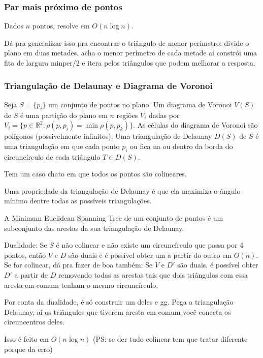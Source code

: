 \subsubsection{Par mais próximo de pontos}

Dados $n$ pontos, resolve em $O(n \log n)$.


Dá pra generalizar isso pra encontrar o triângulo de menor perímetro:
divide o plano em duas metades, acha o menor perímetro de cada metade
aí constrói uma fita de largura $\text{minper}/2$ e itera pelos triângulos
que podem melhorar a resposta.

\subsubsection{Triangulação de Delaunay e Diagrama de Voronoi}

Seja $S = \{p_i\}$ um conjunto de pontos no plano. Um diagrama de Voronoi
$V(S)$ de $S$ é uma partição do plano em $n$ regiões $V_i$ dadas por
$V_i = \{ p \in \mathbb{R}^2 : \rho(p, p_i) = \min \rho(p, p_k)\}$. As células
do diagrama de Voronoi são polígonos (possivelmente infinitos). Uma triangulação
de Delaunay $D(S)$ de $S$ é uma triangulação em que cada ponto $p_i$ ou fica na ou
dentro da borda do circuncírculo de cada triângulo $T \in D(S)$.

Tem um caso chato em que todos os pontos são colineares.

Uma propriedade da triangulação de Delaunay é que ela maximiza o ângulo mínimo
dentre todas as possíveis triangulações.

A Minimum Euclidean Spanning Tree de um conjunto de pontos é um subconjunto
das arestas da sua triangulação de Delaunay.

Dualidade: Se $S$ é não colinear e não existe um circuncírculo que passa por 
4 pontos, então $V$ e $D$ são duais e é possível obter um a partir
do outro em $O(n)$. Se for colinear, dá pra fazer de boa também: Se $V$ e $D'$ são
duais, é possível obter $D'$ a partir de $D$ removendo todas as arestas tais que
dois triângulos com essa aresta em comum tenham o mesmo circuncírculo.

Por conta da dualidade, é só construir um deles e gg. Pega a triangulação Delaunay,
aí os triângulos que tiverem aresta em comum você conecta os circuncentros deles.

Isso é feito em $O(n \log n)$ (PS: se der tudo colinear tem que tratar diferente porque
da erro)

